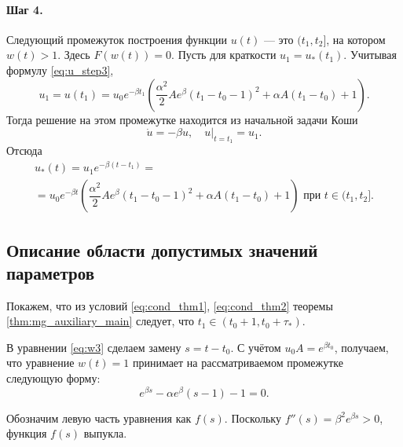 \paragraph{Шаг 4.} Следующий промежуток построения функции $u(t)$ --- это $(t_1, t_2]$, на котором $w(t) > 1$. Здесь $F(w(t)) = 0$. Пусть для краткости $u_1 = u_*(t_1)$. Учитывая формулу \eqref{eq:u_step3},
\begin{equation*}
	u_1 = u(t_1) = u_0 e^{-\beta t_1}\left(\dfrac{\alpha^2}{2}Ae^{\beta}(t_1 - t_0 - 1)^2+\alpha A(t_1 - t_0)+1\right).
\end{equation*}
Тогда решение на этом промежутке находится из начальной задачи Коши
\begin{equation*}
	\dot{u}=-\beta u,\quad u|_{t = t_1}=u_1.
\end{equation*}
Отсюда 
\begin{multline}
	\label{eq:u_step4}
	u_*(t)= u_1 e^{-\beta(t - t_1)} =\\= u_0 e^{-\beta t}\left(\dfrac{\alpha^2}{2}Ae^{\beta}(t_1 - t_0 - 1)^2 + \alpha A(t_1 - t_0) + 1\right) \text{ при } t \in (t_1,t_2].
\end{multline}

\subsection{Описание области допустимых значений параметров}

Покажем, что из условий \eqref{eq:cond_thm1}, \eqref{eq:cond_thm2} теоремы \ref{thm:mg_auxiliary_main} следует, что $t_1 \in (t_0+1,t_0+\tau_*)$.

В уравнении \eqref{eq:w3} сделаем замену $s = t - t_0$. С учётом $u_0A=e^{\beta t_0}$, получаем, что уравнение $w(t)=1$ принимает на рассматриваемом промежутке следующую форму:
\begin{equation}
	\label{eq:f}
	e^{\beta s} - \alpha e^{\beta}(s-1) - 1 = 0.
\end{equation}

Обозначим левую часть уравнения как $f(s)$. Поскольку $f''(s) = \beta^2 e^{\beta s} > 0$, функция $f(s)$ выпукла.

